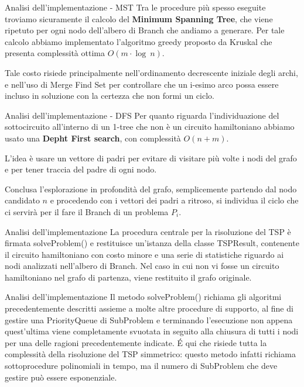 \documentclass[10pt]{beamer}
\begin{document}
    \begin{frame}{Analisi dell'implementazione - MST}
        Tra le procedure più spesso eseguite troviamo sicuramente il calcolo del \textbf{Minimum Spanning Tree}, che viene ripetuto per ogni nodo dell'albero di Branch che andiamo a generare.
        Per tale calcolo abbiamo implementato l'algoritmo greedy proposto da Kruskal che presenta complessità ottima $O(m\cdot \log\:n)$.

        Tale costo risiede principalmente nell'ordinamento decrescente iniziale degli archi, e nell'uso di Merge Find Set per controllare che un i-esimo arco possa essere incluso in soluzione con la certezza che non formi un ciclo.
    \end{frame}

    \begin{frame}{Analisi dell'implementazione - DFS}
        Per quanto riguarda l'individuazione del sottocircuito all'interno di un 1-tree che non è un circuito hamiltoniano abbiamo usato una \textbf{Depht First search}, con complessità $O(n+m)$.

        L'idea è usare un vettore di padri per evitare di visitare più volte i nodi del grafo e per tener traccia del padre di ogni nodo.

        Conclusa l'esplorazione in profondità del grafo, semplicemente partendo dal nodo candidato $n$ e procedendo con i vettori dei padri a ritroso, si individua il ciclo che ci servirà per il fare il Branch di un problema $P_i$.
    \end{frame}

    \begin{frame}{Analisi dell'implementazione}
        La procedura centrale per la risoluzione del TSP è firmata {\selectfont solveProblem()} e restituisce un'istanza della classe {\selectfont TSPResult}, contenente il circuito hamiltoniano con costo minore e una serie di statistiche riguardo ai nodi analizzati nell'albero di Branch.
        \newline
        \newline
        Nel caso in cui non vi fosse un circuito hamiltoniano nel grafo di partenza, viene restituito il grafo originale.
    \end{frame}

    \begin{frame}{Analisi dell'implementazione}
        Il metodo {\selectfont solveProblem()} richiama gli algoritmi precedentemente descritti assieme a molte altre procedure di supporto, al fine di gestire una {\selectfont PriorityQueue} di {\selectfont SubProblem} e terminando l'esecuzione non appena quest'ultima viene completamente svuotata in seguito alla chiusura di tutti i nodi per una delle ragioni precedentemente indicate.
        \newline
        \newline
        É qui che risiede tutta la complessità della risoluzione del TSP simmetrico: questo metodo infatti richiama sottoprocedure polinomiali in tempo, ma il numero di {\selectfont SubProblem} che deve gestire può essere esponenziale.
    \end{frame}
\end{document}
